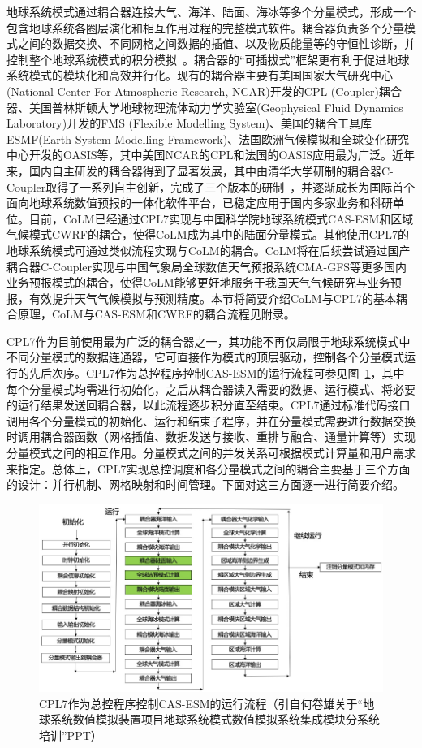 地球系统模式通过耦合器连接大气、海洋、陆面、海冰等多个分量模式，形成一个包含地球系统各圈层演化和相互作用过程的完整模式软件。耦合器负责多个分量模式之间的数据交换、不同网格之间数据的插值、以及物质能量等的守恒性诊断，并控制整个地球系统模式的积分模拟~\citep{tangyanli_2015, chenyiran_2017}。耦合器的“可插拔式”框架更有利于促进地球系统模式的模块化和高效并行化。现有的耦合器主要有美国国家大气研究中心(National Center For Atmospheric Research, NCAR)开发的CPL (Coupler)耦合器、美国普林斯顿大学地球物理流体动力学实验室(Geophysical Fluid Dynamics Laboratory)开发的FMS (Flexible Modelling System)、美国的耦合工具库ESMF(Earth System Modelling Framework)、法国欧洲气候模拟和全球变化研究中心开发的OASIS等，其中美国NCAR的CPL和法国的OASIS应用最为广泛。近年来，国内自主研发的耦合器得到了显著发展，其中由清华大学研制的耦合器C-Coupler取得了一系列自主创新，完成了三个版本的研制~\citep{LiuLi_2023}，并逐渐成长为国际首个面向地球系统数值预报的一体化软件平台，已稳定应用于国内多家业务和科研单位。目前，CoLM已经通过CPL7实现与中国科学院地球系统模式CAS-ESM和区域气候模式CWRF的耦合，使得CoLM成为其中的陆面分量模式。其他使用CPL7的地球系统模式可通过类似流程实现与CoLM的耦合。CoLM将在后续尝试通过国产耦合器C-Coupler实现与中国气象局全球数值天气预报系统CMA-GFS等更多国内业务预报模式的耦合，使得CoLM能够更好地服务于我国天气气候研究与业务预报，有效提升天气气候模拟与预测精度。本节将简要介绍CoLM与CPL7的基本耦合原理，CoLM与CAS-ESM和CWRF的耦合流程见附录。

CPL7作为目前使用最为广泛的耦合器之一，其功能不再仅局限于地球系统模式中不同分量模式的数据连通器，它可直接作为模式的顶层驱动，控制各个分量模式运行的先后次序。CPL7作为总控程序控制CAS-ESM的运行流程可参见图~\ref{fig:CAS-ESM的运行流程}，其中每个分量模式均需进行初始化，之后从耦合器读入需要的数据、运行模式、将必要的运行结果发送回耦合器，以此流程逐步积分直至结束。CPL7通过标准代码接口调用各个分量模式的初始化、运行和结束子程序，并在分量模式需要进行数据交换时调用耦合器函数（网格插值、数据发送与接收、重排与融合、通量计算等）实现分量模式之间的相互作用。分量模式之间的并发关系可根据模式计算量和用户需求来指定。总体上，CPL7实现总控调度和各分量模式之间的耦合主要基于三个方面的设计：并行机制、网格映射和时间管理。下面对这三方面逐一进行简要介绍。
{
\begin{figure}[htbp]
\centering
\includegraphics{Figures/模式构架/CAS-ESM的运行流程.png}
\caption[CPL7作为总控程序控制CAS-ESM的运行流程]{CPL7作为总控程序控制CAS-ESM的运行流程（引自何卷雄关于“地球系统数值模拟装置项目地球系统模式数值模拟系统集成模块分系统培训”PPT）}
\label{fig:CAS-ESM的运行流程}
\end{figure}
}


